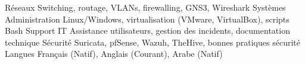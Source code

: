 
\begin{cvskills}
    \cvskill
    {Réseaux}
    {Switching, routage, VLANs, firewalling, GNS3, Wireshark}
    \cvskill
    {Systèmes}
    {Administration Linux/Windows, virtualisation (VMware, VirtualBox), scripts Bash}
    \cvskill
    {Support IT}
    {Assistance utilisateurs, gestion des incidents, documentation technique}
    \cvskill
    {Sécurité}
    {Suricata, pfSense, Wazuh, TheHive, bonnes pratiques sécurité}
    \cvskill
    {Langues}
    {Français (Natif), Anglais (Courant), Arabe (Natif)}
\end{cvskills}